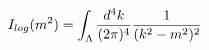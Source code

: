 \begin{equation}
I_{log}(m^{2})=\int_{\Lambda }\frac{d^{4}k}{(2\pi )^{4}}\frac{1}{%
(k^{2}-m^{2})^{2}}  \label{5}
\end{equation}

